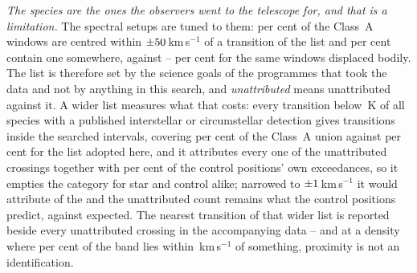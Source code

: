 \emph{The species are the ones the observers went to the telescope for, and
that is a limitation.} The spectral setups are tuned to them: \TnCenPct{} per
cent of the \NWinA{} Class~A windows are centred within
$\pm50$\,km\,s$^{-1}$ of a transition of the list and \TnWinPct{}
per cent contain one somewhere, against \TnCtrlCenLo--\TnCtrlCenHi{} per cent
for the same windows displaced bodily. The list is therefore set by the
science goals of the programmes that took the data and not by anything in this
search, and \emph{unattributed} means unattributed against it. A wider list
measures what that costs: every transition below \XlEuMax\,K of all
\XlNSpecies{} species with a published interstellar or circumstellar detection
\citep{Pickett1998,CDMS2005} gives \XlNTrans{} transitions inside the searched
intervals, covering \XlBandPct{} per cent of the Class~A union against
\MkMaskAPct{} per cent for the list adopted here, and it attributes every one
of the \MkUnattr{} unattributed crossings together with \XlShareWidePct{} per
cent of the control positions' own exceedances, so it empties the category for
star and control alike; narrowed to $\pm1$\,km\,s$^{-1}$ it would
attribute \XlTightNIn{} of the \MkUnattr{} and the unattributed count remains
what the control positions predict, \XlTightObs{} against \XlTightExp{}
expected. The nearest transition of that wider list is reported beside every
unattributed crossing in the accompanying data -- and at a density where
\XlBandPct{} per cent of the band lies within \MaskHalfKms\,km\,s$^{-1}$ of
something, proximity is not an identification.

